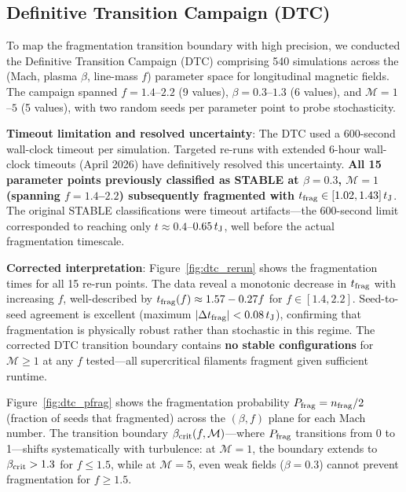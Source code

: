 \documentclass[twoside,twocolumn]{mnras}
\begin{document}
\subsection{Definitive Transition Campaign (DTC)}
\label{sec:dtc}

To map the fragmentation transition boundary with high precision, we conducted the Definitive Transition Campaign (DTC) comprising 540 simulations across the (Mach, plasma $\beta$, line-mass $f$) parameter space for longitudinal magnetic fields. The campaign spanned $f = 1.4$--$2.2$ (9 values), $\beta = 0.3$--$1.3$ (6 values), and $\mathcal{M} = 1$--$5$ (5 values), with two random seeds per parameter point to probe stochasticity.

\textbf{Timeout limitation and resolved uncertainty}: The DTC used a 600-second wall-clock timeout per simulation. Targeted re-runs with extended 6-hour wall-clock timeouts (April 2026) have definitively resolved this uncertainty. \textbf{All 15 parameter points previously classified as STABLE at $\beta = 0.3$, $\mathcal{M} = 1$ (spanning $f = 1.4$--$2.2$) subsequently fragmented with $t_{\rm frag} \in [1.02, 1.43]\,t_{\rm J}$}. The original STABLE classifications were timeout artifacts—the 600-second limit corresponded to reaching only $t \approx 0.4$--$0.65\,t_{\rm J}$, well before the actual fragmentation timescale.

\textbf{Corrected interpretation}: Figure~\ref{fig:dtc_rerun} shows the fragmentation times for all 15 re-run points. The data reveal a monotonic decrease in $t_{\rm frag}$ with increasing $f$, well-described by $t_{\rm frag}(f) \approx 1.57 - 0.27f$ for $f \in [1.4, 2.2]$. Seed-to-seed agreement is excellent (maximum $|\Delta t_{\rm frag}| < 0.08\,t_{\rm J}$), confirming that fragmentation is physically robust rather than stochastic in this regime. The corrected DTC transition boundary contains \textbf{no stable configurations} for $\mathcal{M} \geq 1$ at any $f$ tested—all supercritical filaments fragment given sufficient runtime.

Figure~\ref{fig:dtc_pfrag} shows the fragmentation probability $P_{\rm frag} = n_{\rm frag}/2$ (fraction of seeds that fragmented) across the $(\beta, f)$ plane for each Mach number. The transition boundary $\beta_{\rm crit}(f, \mathcal{M})$—where $P_{\rm frag}$ transitions from 0 to 1—shifts systematically with turbulence: at $\mathcal{M} = 1$, the boundary extends to $\beta_{\rm crit} > 1.3$ for $f \leq 1.5$, while at $\mathcal{M} = 5$, even weak fields ($\beta = 0.3$) cannot prevent fragmentation for $f \geq 1.5$.
\end{document}
